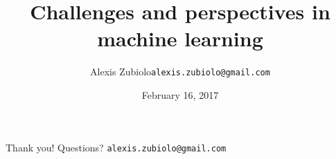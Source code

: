 \documentclass{beamer}
\title[Course presentation]{Challenges and perspectives in machine learning}
\author{Alexis Zubiolo\newline\texttt{alexis.zubiolo@gmail.com}}
\institute{Data Science Team Lead @ Adcash}
\date{February 16, 2017}
\begin{document}
\begin{frame}
  \titlepage
\end{frame}

\begin{frame}
\vfill
\centering
\begin{huge}
\huge{Thank you! Questions?}
\vfill
\texttt{alexis.zubiolo@gmail.com}
\end{huge}
\vfill
\end{frame}
\end{document}
